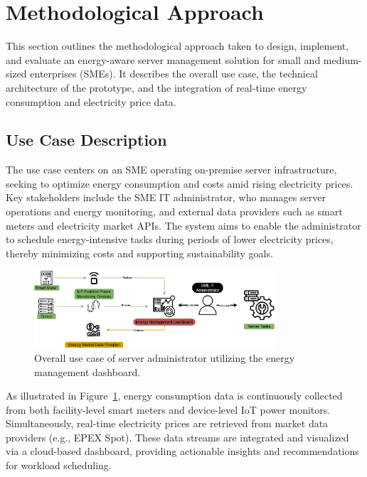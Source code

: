 

\section{Methodological Approach}
\label{methodology:methodological-approach}
This section outlines the methodological approach taken to design, implement, and evaluate an energy-aware server management solution for small and medium-sized enterprises (SMEs).
It describes the overall use case, the technical architecture of the prototype, and the integration of real-time energy consumption and electricity price data.

\subsection{Use Case Description}
\label{methodology:use-case-description}
The use case centers on an SME operating on-premise server infrastructure, seeking to optimize energy consumption and costs amid rising electricity prices. Key stakeholders include the SME IT administrator, who manages server operations and energy monitoring, and external data providers such as smart meters and electricity market APIs. The system aims to enable the administrator to schedule energy-intensive tasks during periods of lower electricity prices, thereby minimizing costs and supporting sustainability goals.
\begin{figure}[htbp]
\centering
\includegraphics[width=0.8\textwidth]{fig/high_level_use_case.png}
\caption{Overall use case of server administrator utilizing the energy management dashboard.}
\label{fig:highleveluse}
\end{figure}
As illustrated in Figure~\ref{fig:highleveluse}, energy consumption data is continuously collected from both facility-level smart meters and device-level IoT power monitors. Simultaneously, real-time electricity prices are retrieved from market data providers (e.g., EPEX Spot). These data streams are integrated and visualized via a cloud-based dashboard, providing actionable insights and recommendations for workload scheduling.

